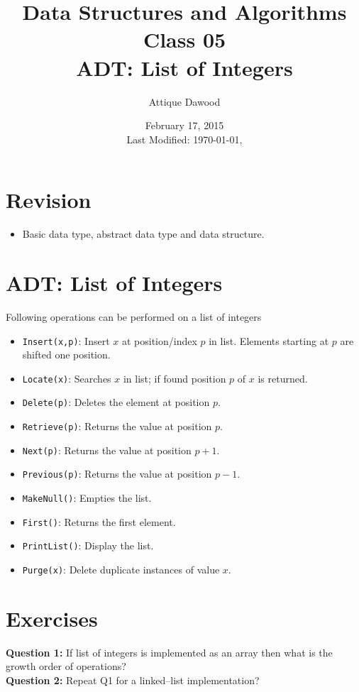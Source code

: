 \documentclass[12pt,a4paper]{article}
\title{Data Structures and Algorithms\\Class 05\\ADT: List of Integers}
\author{Attique Dawood}
\date{February 17, 2015\\[0.2cm] Last Modified: \today, \currenttime}
\begin{document}
\maketitle
\section{Revision}
\begin{itemize}
\item Basic data type, abstract data type and data structure.
\end{itemize}
\section{ADT: List of Integers}
Following operations can be performed on a list of integers
\begin{itemize}
\item \verb|Insert(x,p)|: Insert $x$ at position/index $p$ in list. Elements starting at $p$ are shifted one position.
\item \verb|Locate(x)|: Searches $x$ in list; if found position $p$ of $x$ is returned.
\item \verb|Delete(p)|: Deletes the element at position $p$.
\item \verb|Retrieve(p)|: Returns the value at position $p$.
\item \verb|Next(p)|: Returns the value at position $p+1$.
\item \verb|Previous(p)|: Returns the value at position $p-1$.
\item \verb|MakeNull()|: Empties the list.
\item \verb|First()|: Returns the first element.
\item \verb|PrintList()|: Display the list.
\item \verb|Purge(x)|: Delete duplicate instances of value $x$.
\end{itemize}
\section{Exercises}
\noindent\textbf{Question 1:} If list of integers is implemented as an array then what is the growth order of operations?\\[0.2cm]
\noindent\textbf{Question 2:} Repeat Q1 for a linked--list implementation?


\end{document}
